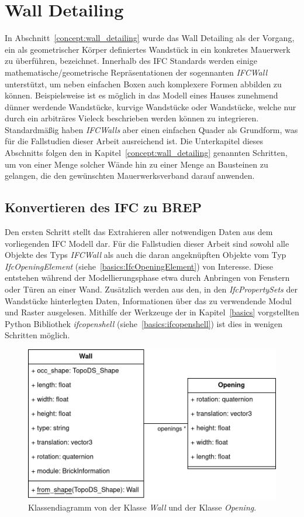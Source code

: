 \section{Wall Detailing}
In Abschnitt~\ref{concept:wall_detailing} wurde das Wall Detailing als der Vorgang, ein als geometrischer Körper definiertes Wandstück in ein konkretes Mauerwerk zu überführen, bezeichnet.
Innerhalb des IFC Standards werden einige mathematische/geometrische Repräsentationen der sogennanten \textit{IFCWall} unterstützt, um neben einfachen Boxen auch komplexere Formen abbilden zu können.
Beispielsweise ist es möglich in das Modell eines Hauses zunehmend dünner werdende Wandstücke, kurvige Wandstücke oder Wandstücke, welche nur durch ein arbiträres Vieleck beschrieben werden können zu integrieren.
Standardmäßig haben \textit{IFCWalls} aber einen einfachen Quader als Grundform, was für die Fallstudien dieser Arbeit ausreichend ist.
Die Unterkapitel dieses Abschnitts folgen den in Kapitel~\ref{concept:wall_detailing} genannten Schritten, um von einer Menge solcher Wände hin zu einer Menge an Bausteinen zu gelangen, die den gewünschten Mauerwerksverband darauf anwenden.

\subsection{Konvertieren des IFC zu BREP}
Den ersten Schritt stellt das Extrahieren aller notwendigen Daten aus dem vorliegenden IFC Modell dar.
Für die Fallstudien dieser Arbeit sind sowohl alle Objekte des Typs \textit{IFCWall} als auch die daran angeknüpften Objekte vom Typ \textit{IfcOpeningElement} (siehe~\ref{basics:IfcOpeningElement}) von Interesse.
Diese entstehen während der Modellierungsphase etwa durch Anbringen von Fenstern oder Türen an einer Wand.
Zusätzlich werden aus den, in den \textit{IfcPropertySets} der Wandstücke hinterlegten Daten, Informationen über das zu verwendende Modul und Raster ausgelesen.
Mithilfe der Werkzeuge der in Kapitel~\ref{basics} vorgstellten Python Bibliothek \textit{ifcopenshell} (siehe~\ref{basics:ifcopenshell}) ist dies in wenigen Schritten möglich.
\begin{figure}[htb]
  \centering
  \includegraphics[width=0.8\columnwidth]{fig/klassendiagramm_ifc_to_wall.drawio.png}
  \caption{Klassendiagramm von der Klasse \textit{Wall} und der Klasse \textit{Opening}.}
  \label{fig:real:ifc_to_wall}
\end{figure}

